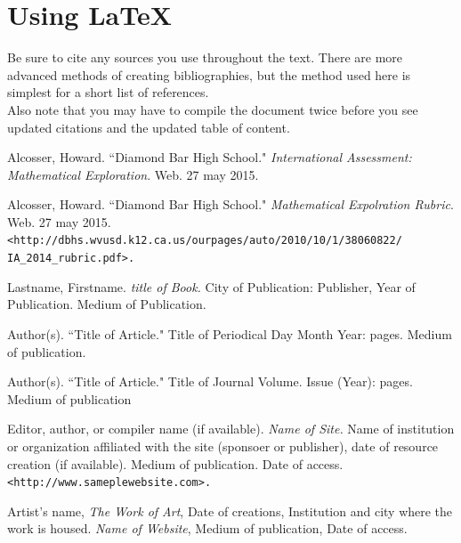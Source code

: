 \documentclass[11pt]{article}
\begin{document}
\section{Using \LaTeX\ }
Be sure to cite any sources you use throughout the text. There are more advanced methods of creating bibliographies, but the method used here is simplest for a short list of references.\\

Also note that you may have to compile the document twice before you see updated citations and the updated table of content.

\pagebreak
\begin{thebibliography}{}

Alcosser, Howard.
``Diamond Bar High School."
\textit{International Assessment: Mathematical Exploration}.
Web. 27 may 2015.

Alcosser, Howard.
``Diamond Bar High School."
\textit{Mathematical Expolration Rubric}.
Web. 27 may 2015.
\texttt{<http://dbhs.wvusd.k12.ca.us/ourpages/auto/2010/10/1/38060822/\\IA\_2014\_rubric.pdf>.}

Lastname, Firstname.
\textit{title of Book.}
City of Publication:
Publisher,
Year of Publication.
Medium of Publication. %

Author(s).
``Title of Article."
Title of Periodical
Day Month Year:
pages.
Medium of publication.

Author(s).
``Title of Article."
Title of Journal
Volume. Issue (Year):
pages.
Medium of publication

Editor, author, or compiler name (if available).
\textit{Name of Site.}
Name of institution or organization affiliated with the site (sponsoer or publisher),
date of resource creation (if available).
Medium of publication.
Date of access.
\texttt{<http://www.sameplewebsite.com>.}

Artist's name,
\textit{The Work of Art},
Date of creations,
Institution and city where the work is housed.
\textit{Name of Website},
Medium of publication,
Date of access.

\end{thebibliography}
\end{document}
